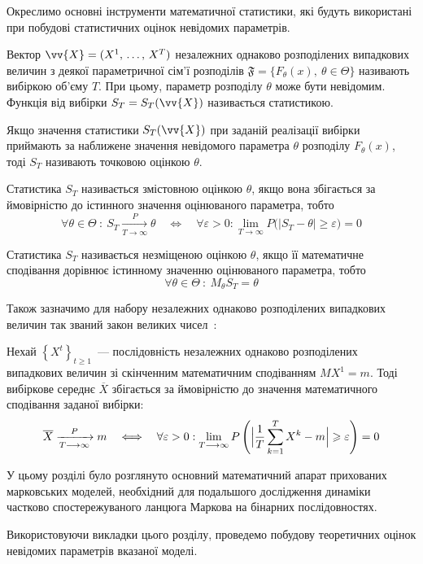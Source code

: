Окреслимо основні інструменти математичної статистики, які будуть використані при побудові статистичних оцінок невідомих параметрів.

Вектор $\vv{X}=(X^1,\,\ldots,\,X^T)$ незалежних однаково розподілених випадкових величин з деякої параметричної сім'ї розподілів $\mathfrak{F}=\{ F_\theta(x),\ \theta \in \Theta \}$ називають вибіркою об'єму $T$. При цьому, параметр розподілу $\theta$ може бути невідомим. Функція від вибірки $S_T=S_T(\vv{X})$ називається статистикою. 

Якщо значення статистики $S_T(\vv{X})$ при заданій реалізації вибірки приймають за наближене значення невідомого параметра $\theta$ розподілу $F_\theta(x)$, тоді $S_T$ називають точковою оцінкою $\theta$. 

\begin{definition}
    Статистика $S_T$ називається змістовною оцінкою $\theta$, якщо вона збігається за ймовірністю до істинного значення оцінюваного параметра, тобто 
    \begin{equation*}
        \forall \theta \in \Theta\ :\ S_T \xrightarrow[T \longrightarrow \infty]{P} \theta \quad \Longleftrightarrow \quad \forall \varepsilon > 0 : \lim\limits_{T \longrightarrow \infty} P\bigl( |S_T - \theta| \geqslant \varepsilon \bigr) = 0
    \end{equation*}
\end{definition}

\begin{definition}
    Статистика $S_T$ називається незміщеною оцінкою $\theta$, якщо її математичне сподівання дорівнює істинному значенню оцінюваного параметра, тобто
    \begin{equation*}
        \forall \theta \in \Theta\ :\ M_\theta S_T = \theta
    \end{equation*}
\end{definition}

Також зазначимо для набору незалежних однаково розподілених випадкових величин так званий закон великих чисел~\cite{Larsen2017}:

\begin{theorem}
    Нехай $\left\{ X^t \right\}_{t\geqslant 1}$~--- послідовність незалежних однаково розподілених випадкових величин зі скінченним математичним сподіванням $MX^1=m$. Тоді вибіркове середнє $\overline{X}$ збігається за ймовірністю до значення математичного сподівання заданої вибірки:
    \begin{equation*}
        \overline{X} \xrightarrow[T \longrightarrow \infty]{P} m \quad \Longleftrightarrow \quad \forall \varepsilon > 0 : \lim\limits_{T \longrightarrow \infty} P\left( \Bigl| \frac{1}{T}\sum\limits_{k=1}^{T} X^k - m \Bigr| \geqslant \varepsilon \right) = 0
    \end{equation*}
\end{theorem}

\chapconclude{\ref{chap: review}}

У цьому розділі було розглянуто основний математичний апарат прихованих марковських моделей, необхідний для подальшого дослідження динаміки частково спостережуваного ланцюга Маркова на бінарних послідовностях.

Використовуючи викладки цього розділу, проведемо побудову теоретичних оцінок невідомих параметрів вказаної моделі.